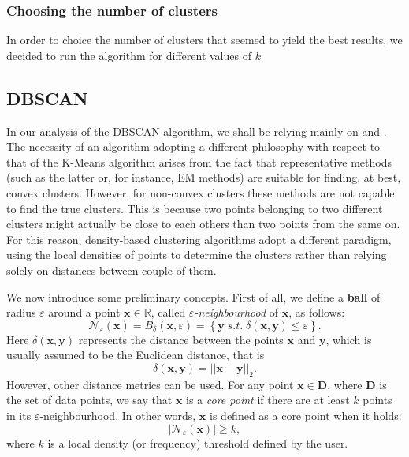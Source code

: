 \documentclass[a4paper]{article}
\begin{document}
	\subsubsection{Choosing the number of clusters}
	In order to choice the number of clusters that seemed to yield the best results, we decided to run the algorithm for different values of $k$ 
	
	\subsection{DBSCAN}
	In our analysis of the DBSCAN algorithm, we shall be relying mainly on \cite{Ester96adensity-based} and \cite{zaki2014dataminingbook}. The necessity of an algorithm adopting a different philosophy with respect to that of the K-Means algorithm arises from the fact that representative methods (such as the latter or, for instance, EM methods) are suitable for finding, at best, convex clusters.
	However, for non-convex clusters these methods are not capable to find the true clusters. This is because two points belonging to two different clusters might actually be close to each others than two points from the same on.
	For this reason, density-based clustering algorithms adopt a different paradigm, using the local densities of points to determine the clusters rather than relying solely on distances between couple of them.
	
	We now introduce some preliminary concepts. First of all, we define a \textbf{ball} of radius $\varepsilon$ around a point $\boldsymbol{x} \in \mathbb{R}$, called \textit{$\varepsilon$-neighbourhood} of $\boldsymbol{x}$, as follows:
	\begin{equation*}
	\mathcal{N}_{\varepsilon} (\boldsymbol{x}) = B_{\delta}\left( \boldsymbol{x}, \varepsilon \right) = \left\{ \boldsymbol{y} \; s.t. \; \delta \left( \boldsymbol{x}, \boldsymbol{y} \right) \leq \varepsilon \right\}.
	\end{equation*}
	Here $\delta \left( \boldsymbol{x}, \boldsymbol{y} \right)$ represents the distance between the points $\boldsymbol{x}$ and $\boldsymbol{y}$, which is usually assumed to be the Euclidean distance, that is
	\begin{equation*}
	\delta(\boldsymbol{x}, \boldsymbol{y}) = || \boldsymbol{x} - \boldsymbol{y} ||_{2}.
	\end{equation*}
	However, other distance metrics can be used.
	For any point $\boldsymbol{x} \in \boldsymbol{D}$, where $\boldsymbol{D}$ is the set of data points, we say that $\boldsymbol{x}$ is a \textit{core point} if there are at least $k$ points in its $\varepsilon$-neighbourhood.
	In other words, $\boldsymbol{x}$ is defined as a core point when it holds:
	\begin{equation*}
	| \mathcal{N}_{\varepsilon}(\boldsymbol{x})| \geq k,
	\end{equation*}
	where $k$ is a local density (or frequency) threshold defined by the user.
	
\end{document}
